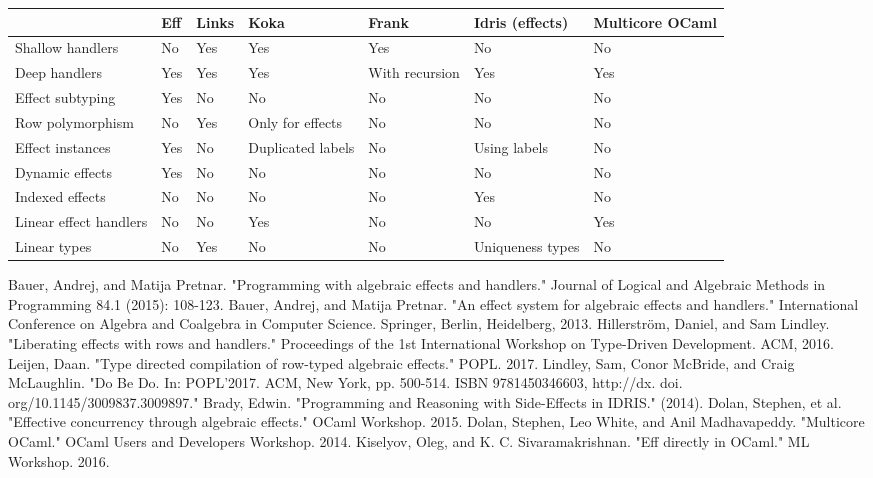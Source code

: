\documentclass[12pt]{article}
\begin{document}
\newpage
\hfill
\begin{adjustbox}{angle=90}
\begin{tabular}{ l | l | l | l | l | l | l }
				& Eff\cite{eff1}\cite{eff2}		& Links \cite{links} 	& Koka\cite{koka}	& Frank\cite{frank} 	& Idris (effects)\cite{idris}		& Multicore OCaml \cite{multicoreocaml1}\cite{multicoreocaml2} \\ \hline
Shallow handlers 		& No					& Yes 			& Yes 			& Yes 				& No 					& No \\ \hline
Deep handlers 		& Yes					& Yes 			& Yes 			& With recursion 		& Yes 					& Yes \\ \hline
Effect subtyping		& Yes					& No			& No			& No				& No	 				& No \\ \hline
Row polymorphism		& No					& Yes			& Only for effects 	& No				& No 					& No \\ \hline
Effect instances		& Yes					& No			& Duplicated labels 	& No				& Using labels			& No \\ \hline
Dynamic effects		& Yes					& No			& No		      	& No				& No 					& No \\ \hline
Indexed effects		& No					& No			& No			& No				& Yes 					& No \\ \hline
Linear effect handlers	& No					& No			& Yes			& No				& No					& Yes \\ \hline
Linear types			& No					& Yes			& No			& No				& Uniqueness types			& No \\
\end{tabular}
\end{adjustbox}
\hfill
\null

\newpage

\begin{thebibliography}{9}
Bauer, Andrej, and Matija Pretnar. "Programming with algebraic effects and handlers." Journal of Logical and Algebraic Methods in Programming 84.1 (2015): 108-123.
Bauer, Andrej, and Matija Pretnar. "An effect system for algebraic effects and handlers." International Conference on Algebra and Coalgebra in Computer Science. Springer, Berlin, Heidelberg, 2013.
Hillerstr\"{o}m, Daniel, and Sam Lindley. "Liberating effects with rows and handlers." Proceedings of the 1st International Workshop on Type-Driven Development. ACM, 2016.
Leijen, Daan. "Type directed compilation of row-typed algebraic effects." POPL. 2017.
Lindley, Sam, Conor McBride, and Craig McLaughlin. "Do Be Do. In: POPL'2017. ACM, New York, pp. 500-514. ISBN 9781450346603, http://dx. doi. org/10.1145/3009837.3009897."
Brady, Edwin. "Programming and Reasoning with Side-Effects in IDRIS." (2014).
Dolan, Stephen, et al. "Effective concurrency through algebraic effects." OCaml Workshop. 2015.
Dolan, Stephen, Leo White, and Anil Madhavapeddy. "Multicore OCaml." OCaml Users and Developers Workshop. 2014.
Kiselyov, Oleg, and K. C. Sivaramakrishnan. "Eff directly in OCaml." ML Workshop. 2016.
\end{thebibliography}
\end{document}
